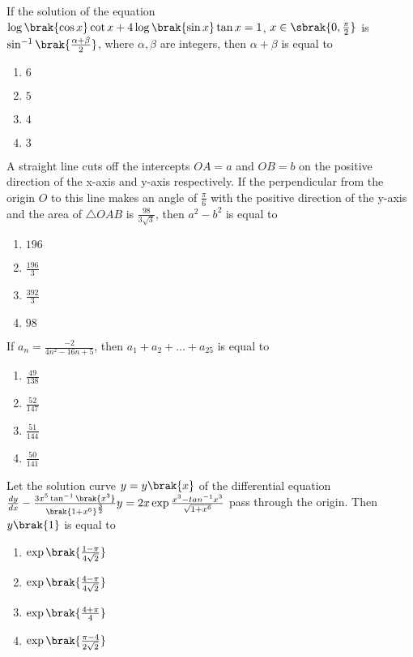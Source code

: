 \iffalse
\title{2023}
\author{AI24BTECH11006}
\section{mcq-single}
\fi
\item If the solution of the equation $\log\brak{\cos{x}}\cot{x} + 4\log\brak{\sin{x}}\tan{x} = 1$, $x \in \sbrak{0, \frac{\pi}{2}}$ is $\sin^{-1}\brak{\frac{\alpha + \beta}{2}}$, where $\alpha, \beta$ are integers, then $\alpha + \beta$ is equal to 
    \hfill{}
	\begin{enumerate}
    \item $6$
        \item $5$
        \item $4$
        \item $3$
    \end{enumerate}
\item A straight line cuts off the intercepts $OA = a$ and $OB = b$ on the positive direction of the x-axis and y-axis respectively. If the perpendicular from the origin $O$ to this line makes an angle of $\frac{\pi}{6}$ with the positive direction of the y-axis and the area of $\triangle OAB$ is $\frac{98}{3\sqrt{3}}$, then $a^2 - b^2$ is equal to 
   \hfill{}
	\begin{enumerate}
        \item $196$
        \item $\frac{196}{3}$
        \item $\frac{392}{3}$
        \item $98$
    \end{enumerate}
\item If $a_n=\frac{-2}{4n^2 - 16n + 5}$, then $a_1 + a_2 + \dots + a_{25}$ is equal to 
   \hfill{}
	\begin{enumerate}
        \item $\frac{49}{138}$
        \item $\frac{52}{147}$
        \item $\frac{51}{144}$
        \item $\frac{50}{141}$
    \end{enumerate}
\item Let the solution curve $y = y\brak{x}$ of the differential equation $\frac{dy}{dx} - \frac{3 x^5 \tan^{-1}\brak{x^3}}{\brak{1+x^6}^\frac{3}{2}}y=2x\exp{\frac{x^3-tan^{-1} x^3}{\sqrt{1+x^6}}}$ pass through the origin. Then  $y\brak{1}$ is equal to 
   \hfill{}
	\begin{enumerate}
        \item $\exp\brak{\frac{1-\pi}{4\sqrt{2}}}$
        \item $\exp\brak{\frac{4-\pi}{4\sqrt{2}}}$
        \item $\exp\brak{\frac{4+\pi}{4}}$
        \item $\exp\brak{\frac{\pi-4}{2\sqrt{2}}}$
    \end{enumerate}
